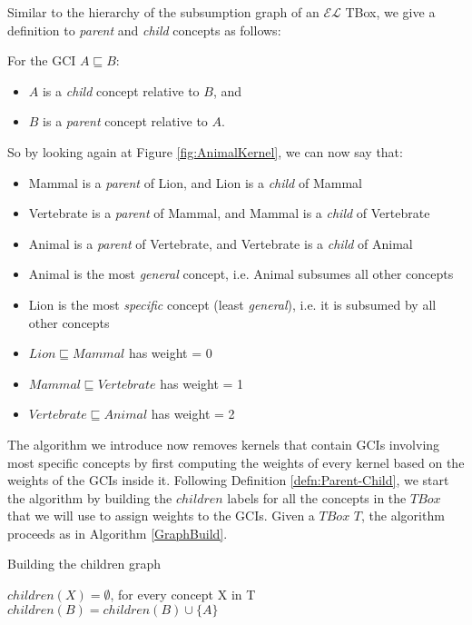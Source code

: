 Similar to the hierarchy of the subsumption graph of an $\mathcal{EL}$ TBox, we give a definition to \textit{parent} and \textit{child} concepts as follows:
\begin{defn}
\label{defn:Parent-Child}
For the GCI $A \sqsubseteq B$:
\begin{itemize}
\item $A$ is a \textit{child} concept relative to $B$, and
\item $B$ is a \textit{parent} concept relative to $A$.\\
\end{itemize}
\end{defn}

So by looking again at Figure \ref{fig:AnimalKernel}, we can now say that:
\begin{itemize}
\item Mammal is a \textit{parent} of Lion, and Lion is a \textit{child} of Mammal
\item Vertebrate is a \textit{parent} of Mammal, and Mammal is a \textit{child} of Vertebrate
\item Animal is a \textit{parent} of Vertebrate, and Vertebrate is a \textit{child} of Animal
\item Animal is the most \textit{general} concept, i.e. Animal subsumes all other concepts
\item Lion is the most \textit{specific} concept (least \textit{general}), i.e. it is subsumed by all other concepts
\item $Lion \sqsubseteq Mammal$ has weight = 0
\item $Mammal \sqsubseteq Vertebrate$ has weight = 1
\item $Vertebrate \sqsubseteq Animal$ has weight = 2
\end{itemize}

The algorithm we introduce now removes kernels that contain GCIs involving most specific concepts by first computing the weights of every kernel based on the weights of the GCIs inside it. Following Definition \ref{defn:Parent-Child}, we start the algorithm by building the $children$ labels for all the concepts in the $TBox$ that we will use to assign weights to the GCIs. Given a $TBox$ $T$, the algorithm proceeds as in Algorithm \ref{GraphBuild}.

\begin{algorithm}
\caption{Building the children graph}
\label{GraphBuild}
\begin{algorithmic}[1]
\State $children(X) = \emptyset$, for every concept X in T 
\State $children(B) = children(B) \cup \{ A \}$
\EndFor
\EndFunction
\end{algorithmic}
\end{algorithm}

